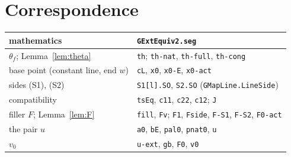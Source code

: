 \documentclass[11pt]{article}
\theoremstyle{definition}
\theoremstyle{remark}
\begin{document}
\section*{Correspondence}

\begin{center}
\begin{tabular}{ll}
mathematics & \texttt{GExtEquiv2.seg}\\\hline
$\theta_f$; Lemma~\ref{lem:theta} & \texttt{th}; \texttt{th-nat}, \texttt{th-full}, \texttt{th-cong}\\
base point (constant line, end $w$) & \texttt{cL}, \texttt{x0}, \texttt{x0-E}, \texttt{x0-act}\\
sides (S1), (S2) & \texttt{S1[l].SO}, \texttt{S2.SO} (\texttt{GMapLine.LineSide})\\
compatibility & \texttt{tsEq}, \texttt{c11}, \texttt{c22}, \texttt{c12}; \texttt{J}\\
filler $F$; Lemma~\ref{lem:F} & \texttt{fill}, \texttt{Fv}; \texttt{F1}, \texttt{Fside}, \texttt{F-S1}, \texttt{F-S2}, \texttt{F0-act}\\
the pair $u$ & \texttt{a0}, \texttt{bE}, \texttt{pal0}, \texttt{pnat0}, \texttt{u}\\
$v_0$ & \texttt{u-ext}, \texttt{gb}, \texttt{F0}, \texttt{v0}
\end{tabular}
\end{center}
\end{document}
